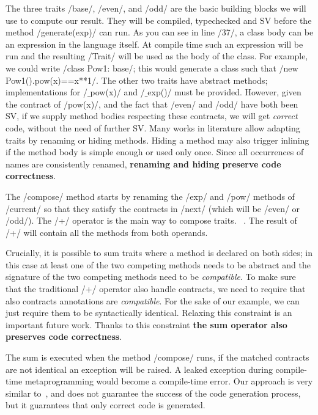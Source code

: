 The three traits /base/, /even/, and /odd/ are the basic building blocks we will use to compute our result. They will be compiled, typechecked and SV before the method /generate(exp)/ can run.
As you can see in line /37/, a class body can be an expression in the language itself.
At compile time such an expression will be run and the resulting /Trait/ will be used as the body of the class.
For example, we could write /class Pow1: base/; this would generate a class such that /new Pow1().pow(x)==x**1/.
The other two traits have abstract methods; implementations for /$\_$pow(x)/ and /$\_$exp()/ must be provided. However, given the contract of /pow(x)/,
and the fact that /even/ and /odd/ have both been SV,
if we supply method bodies respecting these contracts, we will get \emph{correct} code, without the need of further SV.
Many works in literature allow adapting traits by renaming or hiding methods\cite{servetto2014meta,reppy2007metaprogramming,liquori2008feathertrait}. Hiding a method may also trigger inlining if the method body is simple enough or used only once.
Since all occurrences of names are consistently renamed, \textbf{renaming and hiding preserve code correctness}.

The /compose/ method starts by renaming the /exp/ and /pow/ methods of /current/
so that they satisfy the contracts in /next/ (which will be 
/even/ or /odd/).
The /+/ operator is the main way to compose traits.%
~\cite{scharli2003traits,LagorioSZ09}.
The result of /+/ will contain all the methods from both operands.

Crucially, it is possible to sum traits where a method is declared on both sides; in this case at least one of the two competing methods needs to be abstract and the signature of the two competing methods need to be \emph{compatible}.
To make sure that the traditional /+/ operator also handle contracts, we need to require that also contracts annotations are \emph{compatible}.
For the sake of our example, we can just require them to be syntactically identical. Relaxing this constraint is an important future work.
Thanks to this constraint \textbf{the sum operator also preserves code correctness}.

The sum is executed when the method /compose/ runs, if the matched contracts are not identical an exception will be raised. A leaked exception during compile-time metaprogramming would become a compile-time error. 
Our approach is very similar to~\cite{servetto2014meta}, and does not guarantee the success of the code generation process, but it guarantees that only correct code is generated.

